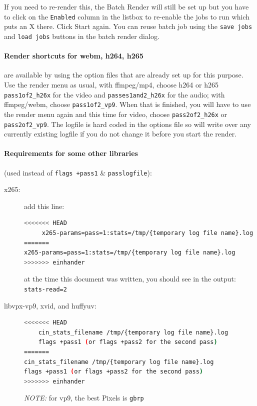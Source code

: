 If you need to re-render this, the Batch Render will still be set up but you have to click on the \texttt{Enabled} column in the listbox to re-enable the jobs to run which puts an X there.  Click Start again. You can reuse batch job using the \texttt{save jobs} and \texttt{load jobs} buttons in the batch render dialog.

\paragraph{Render shortcuts for webm, h264, h265} are available by using the option files that are already set up for this purpose.  Use the render menu as usual, with ffmpeg/mp4, choose h264 or h265 \texttt{pass1of2\_h26x} for the video and \texttt{passes1and2\_h26x} for the audio; with ffmpeg/webm, choose \texttt{pass1of2\_vp9}.  When that is finished, you will have to use the render menu again and this time for video, choose \texttt{pass2of2\_h26x} or \texttt{pass2of2\_vp9}.  The logfile is hard coded in the options file so will write over any currently existing logfile if you do not change it before you start the render.

\paragraph{Requirements for some other libraries} (used instead of \texttt{flags +pass1} \& \texttt{passlogfile}):

\begin{description}
    \item[x265:] add this line:
    \begin{lstlisting}[language=bash]
<<<<<<< HEAD
     x265-params=pass=1:stats=/tmp/{temporary log file name}.log
=======
x265-params=pass=1:stats=/tmp/{temporary log file name}.log
>>>>>>> einhander
    \end{lstlisting}      
    at the time this document was written, you should see in the output:  \texttt{stats-read=2}
    
    \item[libvpx-vp9, xvid, and huffyuv:]
    \begin{lstlisting}[language=bash]
<<<<<<< HEAD
    cin_stats_filename /tmp/{temporary log file name}.log
    flags +pass1 (or flags +pass2 for the second pass)
=======
cin_stats_filename /tmp/{temporary log file name}.log
flags +pass1 (or flags +pass2 for the second pass)
>>>>>>> einhander
    \end{lstlisting} 
    \noindent \textit{NOTE:} for vp9, the best Pixels is \texttt{gbrp}   
\end{description}

